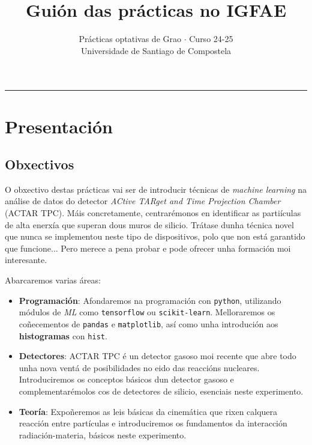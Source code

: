 \documentclass[11pt, a4paper]{article}
\title{\textbf{Guión das prácticas no IGFAE}}
\author{%
\small{Prácticas optativas de Grao $\cdot$ Curso 24-25}\\
\small{Universidade de Santiago de Compostela}}
\date{\empty}%
\begin{document}
\begin{minipage}{0.48\linewidth}
    \maketitle
\end{minipage}\hfill
\begin{minipage}{0.48\linewidth}
    \tableofcontents
\end{minipage}

\noindent\rule{\textwidth}{1pt}
\section{Presentación}
\subsection{Obxectivos}
O obxectivo destas prácticas vai ser de introducir técnicas de \textit{machine learning} na análise de datos do detector \textit{ACtive TARget and Time Projection Chamber} (ACTAR TPC). Máis concretamente, centrarémonos en identificar as partiículas de alta enerxía que superan dous muros de silicio. Trátase dunha técnica novel que nunca se implementou neste tipo de dispositivos, polo que non está garantido que funcione... Pero merece a pena probar e pode ofrecer unha formación moi interesante. 

Abarcaremos varias áreas:
\begin{itemize}
    \item \textbf{Programación}: Afondaremos na programación con \verb|python|, utilizando módulos de \textit{ML} como \verb|tensorflow| ou \texttt{scikit-learn}. Melloraremos os coñecementos de \verb|pandas| e \verb|matplotlib|, así como unha introdución aos \textbf{histogramas} con \verb|hist|.
    
    \item \textbf{Detectores}: ACTAR TPC é un detector gasoso moi recente que abre todo unha nova ventá de posibilidades no eido das reaccións nucleares. Introduciremos os conceptos básicos dun detector gasoso e complementarémolos cos de detectores de silicio, esenciais neste experimento.
    
    \item \textbf{Teoría}: Expoñeremos as leis básicas da cinemática que rixen calquera reacción entre partículas e introduciremos os fundamentos da interacción radiación-materia, básicos neste experimento.
\end{itemize}
\end{document}
